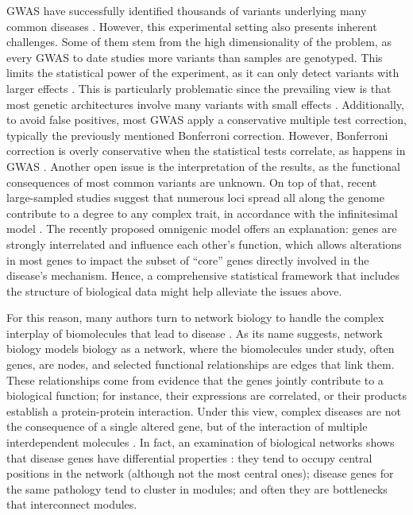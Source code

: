 \documentclass[10pt,letterpaper]{article}
\begin{document}
GWAS have successfully identified thousands of variants underlying many common diseases \cite{buniello_nhgri-ebi_2019}. However, this experimental setting also presents inherent challenges. Some of them stem from the high dimensionality of the problem, as every GWAS to date studies more variants than samples are genotyped. This limits the statistical power of the experiment, as it can only detect variants with larger effects \cite{visscher_10_2017}. This is particularly problematic since the prevailing view is that most genetic architectures involve many variants with small effects \cite{visscher_10_2017}. Additionally, to avoid false positives, most GWAS apply a conservative multiple test correction, typically the previously mentioned Bonferroni correction. However, Bonferroni correction is overly conservative when the statistical tests correlate, as happens in GWAS \cite{wang_statistical_2018}. Another open issue is the interpretation of the results, as the functional consequences of most common variants are unknown. On top of that, recent large-sampled studies suggest that numerous loci spread all along the genome contribute to a degree to any complex trait, in accordance with the infinitesimal model \cite{barton_infinitesimal_2017}. The recently proposed omnigenic model \cite{boyle_expanded_2017} offers an explanation: genes are strongly interrelated and influence each other's function, which allows alterations in most genes to impact the subset of ``core'' genes directly involved in the disease's mechanism. Hence, a comprehensive statistical framework that includes the structure of biological data might help alleviate the issues above.

For this reason, many authors turn to network biology to handle the complex interplay of biomolecules that lead to disease \cite{furlong_human_2013,leisersonNetworkAnalysisGWAS2013}. As its name suggests, network biology models biology as a network, where the biomolecules under study, often genes, are nodes, and selected functional relationships are edges that link them. These relationships come from evidence that the genes jointly contribute to a biological function; for instance, their expressions are correlated, or their products establish a protein-protein interaction. Under this view, complex diseases are not the consequence of a single altered gene, but of the interaction of multiple interdependent molecules \cite{barabasi_network_2011}. In fact, an examination of biological networks shows that disease genes have differential properties \cite{barabasi_network_2011,cai_broker_2010}: they tend to occupy central positions in the network (although not the most central ones); disease genes for the same pathology tend to cluster in modules; and often they are bottlenecks that interconnect modules.
\end{document}
